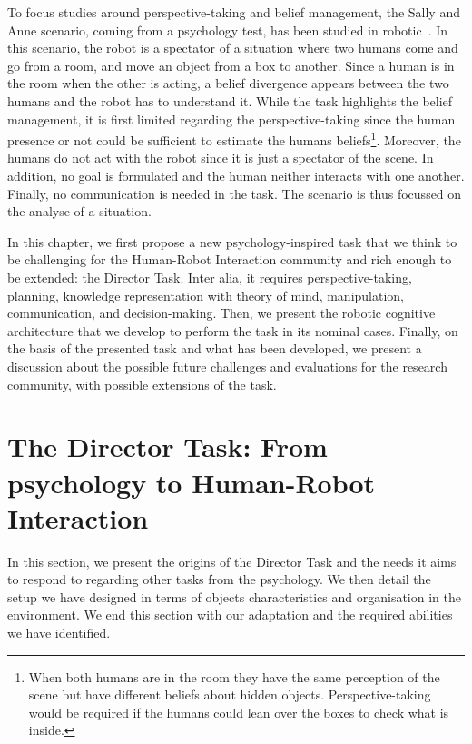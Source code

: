 To focus studies around perspective-taking and belief management, the Sally and Anne scenario, coming from a psychology test, has been studied in robotic~\cite{milliez_2014_framework}. In this scenario, the robot is a spectator of a situation where two humans come and go from a room, and move an object from a box to another. Since a human is in the room when the other is acting, a belief divergence appears between the two humans and the robot has to understand it. While the task highlights the belief management, it is first limited regarding the perspective-taking since the human presence or not could be sufficient to estimate the humans beliefs\footnote{When both humans are in the room they have the same perception of the scene but have different beliefs about hidden objects. Perspective-taking would be required if the humans could lean over the boxes to check what is inside.}. Moreover, the humans do not act with the robot since it is just a spectator of the scene. In addition, no goal is formulated and the human neither interacts with one another. Finally, no communication is needed in the task. The scenario is thus focussed on the analyse of a situation.

In this chapter, we first propose a new psychology-inspired task that we think to be challenging for the Human-Robot Interaction community and rich enough to be extended: the Director Task. Inter alia, it requires perspective-taking, planning, knowledge representation with theory of mind, manipulation, communication, and decision-making. Then, we present the robotic cognitive architecture that we develop to perform the task in its nominal cases. Finally, on the basis of the presented task and what has been developed, we present a discussion about the possible future challenges and evaluations for the research community, with possible extensions of the task.

\section[From psychology to Human-Robot Interaction]{The Director Task: From psychology to Human-Robot Interaction}

In this section, we present the origins of the Director Task and the needs it aims to respond to regarding other tasks from the psychology. We then detail the setup we have designed in terms of objects characteristics and organisation in the environment. We end this section with our adaptation and the required abilities we have identified.


